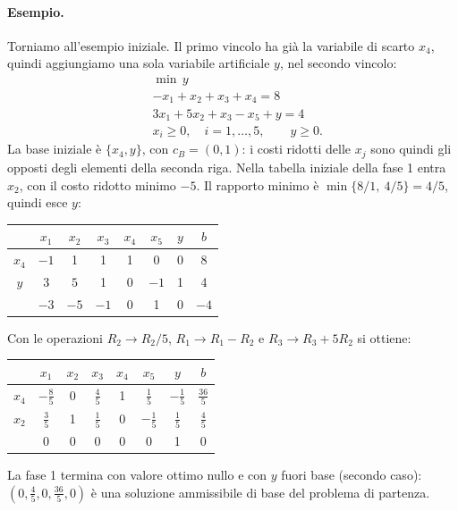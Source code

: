 \paragraph{Esempio.}
Torniamo all'esempio iniziale. Il primo vincolo ha già la variabile di scarto $x_4$, quindi aggiungiamo una sola variabile artificiale $y$, nel secondo vincolo:
\[
\begin{aligned}
&\min\, y \\
&{-x_1} + x_2 + x_3 + x_4 = 8 \\
&3x_1 + 5x_2 + x_3 - x_5 + y = 4 \\
&x_i \ge 0, \quad i = 1, \dots, 5, \qquad y \ge 0.
\end{aligned}
\]
La base iniziale è $\{x_4, y\}$, con $c_B = (0, 1)$: i costi ridotti delle $x_j$ sono quindi gli opposti degli elementi della seconda riga. Nella tabella iniziale della fase 1 entra $x_2$, con il costo ridotto minimo $-5$. Il rapporto minimo è $\min\{8/1,\ 4/5\} = 4/5$, quindi esce $y$:
\begin{center}
\begin{tabular}{c|cccccc|c}
 & $x_1$ & $x_2$ & $x_3$ & $x_4$ & $x_5$ & $y$ & $b$ \\
\hline
$x_4$ & $-1$ & 1 & 1 & 1 & 0 & 0 & 8 \\
$y$ & 3 & $\boxed{5}$ & 1 & 0 & $-1$ & 1 & 4 \\
\hline
 & $-3$ & $-5$ & $-1$ & 0 & 1 & 0 & $-4$ \\
\end{tabular}
\end{center}
Con le operazioni $R_2 \to R_2/5$, $R_1 \to R_1 - R_2$ e $R_3 \to R_3 + 5R_2$ si ottiene:
\begin{center}
\begin{tabular}{c|cccccc|c}
 & $x_1$ & $x_2$ & $x_3$ & $x_4$ & $x_5$ & $y$ & $b$ \\
\hline
$x_4$ & $-\frac85$ & 0 & $\frac45$ & 1 & $\frac15$ & $-\frac15$ & $\frac{36}{5}$ \\
$x_2$ & $\frac35$ & 1 & $\frac15$ & 0 & $-\frac15$ & $\frac15$ & $\frac45$ \\
\hline
 & 0 & 0 & 0 & 0 & 0 & 1 & 0 \\
\end{tabular}
\end{center}
La fase 1 termina con valore ottimo nullo e con $y$ fuori base (secondo caso): $(0, \frac45, 0, \frac{36}{5}, 0)$ è una soluzione ammissibile di base del problema di partenza.

